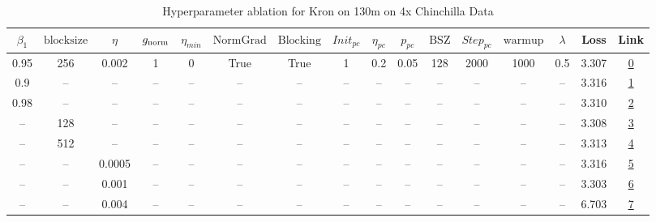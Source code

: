 \begin{table}[H]
\centering
\caption{Hyperparameter ablation for Kron on 130m on 4x Chinchilla Data}
\label{tab:ablation_kron_130m_on_4x_chinchilla_data}
\begin{tabular}{cccccccccccccccc}
\toprule
$\beta_1$ & $\mathrm{block size}$ & $\eta$ & $g_{\mathrm{norm}}$ & $\eta_{min}$ & $\mathrm{NormGrad}$ & $\mathrm{Blocking}$ & $Init_{pc}$ & $\eta_{pc}$ & $p_{pc}$ & $\mathrm{BSZ}$ & $Step_{pc}$ & $\mathrm{warmup}$ & $\lambda$ & Loss & Link \\
\midrule
0.95 & 256 & 0.002 & 1 & 0 & True & True & 1 & 0.2 & 0.05 & 128 & 2000 & 1000 & 0.5 & 3.307 & \href{https://wandb.ai/marin-community/optimizer-scaling/runs/sweep-130m-10B-kronm1a1c3blr0.002-wd0.5-b10.95-plr0.2-pis1-gn1-n-b8692a}{0} \\
\midrule
0.9 & -- & -- & -- & -- & -- & -- & -- & -- & -- & -- & -- & -- & -- & 3.316 & \href{https://wandb.ai/marin-community/optimizer-scaling/runs/sweep-130m-10B-kronc8cdf3lr0.002-wd0.5-b10.9-plr0.2-pis1-gn1-nor-e40586}{1} \\
0.98 & -- & -- & -- & -- & -- & -- & -- & -- & -- & -- & -- & -- & -- & 3.310 & \href{https://wandb.ai/marin-community/optimizer-scaling/runs/sweep-130m-10B-kron05da28lr0.002-wd0.5-b10.98-plr0.2-pis1-gn1-no-be2fbc}{2} \\
-- & 128 & -- & -- & -- & -- & -- & -- & -- & -- & -- & -- & -- & -- & 3.308 & \href{https://wandb.ai/marin-community/optimizer-scaling/runs/sweep-130m-10B-kron494d83lr0.002-wd0.5-b10.95-plr0.2-pis1-gn1-no-134f26}{3} \\
-- & 512 & -- & -- & -- & -- & -- & -- & -- & -- & -- & -- & -- & -- & 3.313 & \href{https://wandb.ai/marin-community/optimizer-scaling/runs/sweep-130m-10B-krond4b6e6lr0.002-wd0.5-b10.95-plr0.2-pis1-gn1-no-439652}{4} \\
-- & -- & 0.0005 & -- & -- & -- & -- & -- & -- & -- & -- & -- & -- & -- & 3.316 & \href{https://wandb.ai/marin-community/optimizer-scaling/runs/sweep-130m-10B-kron53973dlr0.0005-wd0.5-b10.95-plr0.2-pis1-gn1-n-7bcfe7}{5} \\
-- & -- & 0.001 & -- & -- & -- & -- & -- & -- & -- & -- & -- & -- & -- & 3.303 & \href{https://wandb.ai/marin-community/optimizer-scaling/runs/sweep-130m-10B-kron2f3c38lr0.001-wd0.5-b10.95-plr0.2-pis1-gn1-no-a0a910}{6} \\
-- & -- & 0.004 & -- & -- & -- & -- & -- & -- & -- & -- & -- & -- & -- & 6.703 & \href{https://wandb.ai/marin-community/optimizer-scaling/runs/sweep-130m-10B-kron053fe8lr0.004-wd0.5-b10.95-plr0.2-pis1-gn1-no-611f99}{7} \\

\end{tabular}
\end{table}
